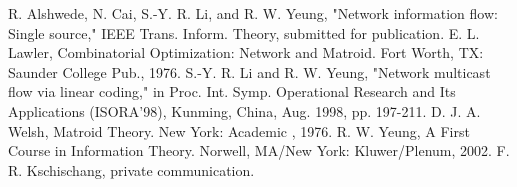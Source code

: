 \documentclass[journal]{IEEEtran}
\begin{document}
\begin{thebibliography}{99}
	 R. Alshwede, N. Cai, S.-Y. R. Li, and R. W. Yeung, "Network information flow: Single source," IEEE Trans. Inform. Theory, submitted for publication.
	 E. L. Lawler, Combinatorial Optimization: Network and Matroid. Fort Worth, TX: Saunder College Pub., 1976.
	 S.-Y. R. Li and R. W. Yeung, "Network multicast flow via linear coding," in Proc. Int. Symp. Operational Research and Its Applications (ISORA'98), Kunming, China, Aug. 1998, pp. 197-211.
	 D. J. A. Welsh, Matroid Theory. New York: Academic , 1976.
	 R. W. Yeung, A First Course in Information Theory. Norwell, MA/New York: Kluwer/Plenum, 2002.
	 F. R. Kschischang, private communication.
\end{thebibliography}
\end{document}
